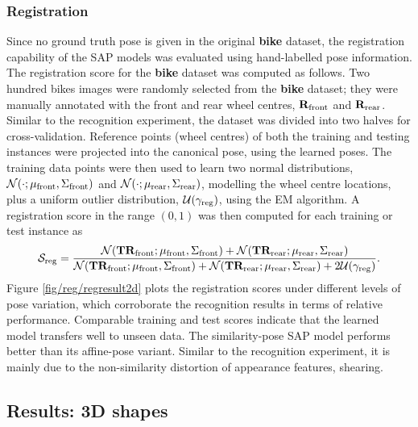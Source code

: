 \subsubsection{Registration} 
Since no ground truth pose is given in the original \textbf{bike} dataset, the registration capability of the SAP models was evaluated using hand-labelled pose information. 
The registration score for the \textbf{bike} dataset was computed as follows.
Two hundred bikes images were randomly selected from the \textbf{bike} dataset; they were manually annotated with the front and rear wheel centres, $\mathbf{R}_\mathrm{front}$ and $\mathbf{R}_\mathrm{rear}$.
Similar to the recognition experiment, the dataset was divided into two halves for cross-validation. 
Reference points (wheel centres) of both the training and testing instances were projected into the canonical pose, using the learned poses. The training data points were then used to learn two normal distributions, $\mathcal{N}(\cdot;\mu_\mathrm{front},\Sigma_\mathrm{front})$ and $\mathcal{N}(\cdot;\mu_\mathrm{rear},\Sigma_\mathrm{rear})$, modelling the wheel centre locations, plus a uniform outlier distribution, $\mathcal{U}(\gamma_\mathrm{reg})$, using the EM algorithm. A registration score in the range $(0,1)$ was then computed for each training or test instance as
\begin{equation}
	\mathcal{S}_\mathrm{reg} = \frac{\mathcal{N}(\mathbf{T}\mathbf{R}_\mathrm{front}; \mu_\mathrm{front},\Sigma_\mathrm{front}) + \mathcal{N}(\mathbf{T}\mathbf{R}_\mathrm{rear}; \mu_\mathrm{rear},\Sigma_\mathrm{rear})}{\mathcal{N}(\mathbf{T}\mathbf{R}_\mathrm{front}; \mu_\mathrm{front},\Sigma_\mathrm{front}) + \mathcal{N}(\mathbf{T}\mathbf{R}_\mathrm{rear}; \mu_\mathrm{rear},\Sigma_\mathrm{rear}) + 2\mathcal{U}(\gamma_\mathrm{reg})}.
	\label{eqn/reg/reg2d_score}
\end{equation}
Figure \ref{fig/reg/regresult2d} plots the registration scores under different levels of pose variation, which corroborate the recognition results in terms of relative performance. 
Comparable training and test scores indicate that the learned model transfers well to unseen data. The similarity-pose SAP model performs better than its affine-pose variant. Similar to the recognition experiment, it is mainly due to the non-similarity distortion of appearance features, \eg shearing. 

\subsection{Results: 3D shapes}

